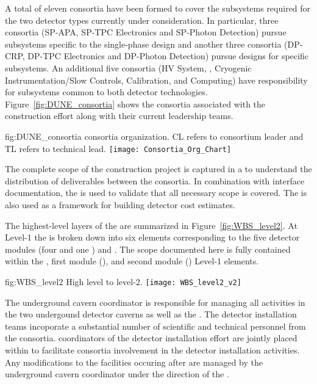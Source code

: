 A total of eleven  consortia have been formed to cover 
the subsystems required for the two detector types currently under
consideration.  In particular, three consortia (SP-APA, SP-TPC
Electronics and SP-Photon Detection) pursue subsystems specific to
the single-phase design and another three consortia (DP-CRP, DP-TPC
Electronics and DP-Photon Detection) pursue designs for 
specific subsystems.  An additional five consortia (HV System, ,
Cryogenic Instrumentation/Slow Controls, Calibration, and Computing)
have responsibility for subsystems common to both detector
technologies.  Figure~\ref{fig:DUNE_consortia} shows the consortia 
associated with the  construction effort along with their 
current leadership teams.  
\begin{dunefigure}{fig:DUNE_consortia}
  { consortia organization. CL refers to consortium leader
    and TL refers to technical lead.}
  \texttt{[image: Consortia\_Org\_Chart]}
\end{dunefigure}

The complete scope of the  construction project is captured in a 
 to understand the distribution of deliverables between 
the consortia.  In combination with interface documentation, the 
 is used to validate that all necessary scope is covered.  The 
 is also used as a framework for building  
detector cost estimates. 

The highest-level layers of the   are summarized 
in Figure~\ref{fig:WBS_level2}.  At Level-1 the  is broken down into 
six elements corresponding to the five  detector modules (four 
 and one ) and .  The scope documented
here is fully contained within the , first  module 
(), and second  module () Level-1 elements.   
\begin{dunefigure}{fig:WBS_level2}
  {High level   to level-2.}
  \texttt{[image: WBS\_level2\_v2]}
\end{dunefigure}

The underground cavern coordinator is responsible for managing all 
activities in the two undergound detector caverns as well as the
. The detector
installation teams incoporate a substantial number of scientific and
technical personnel from the  consortia.   coordinators 
of the detector installation effort are jointly placed within 
  to facilitate consortia involvement in the 
detector installation activities.  Any modifications to the facilities 
occuring after  are managed by the underground cavern 
coordinator under the direction of the .

